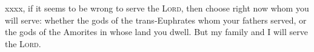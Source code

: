 
\begin{inparaenum}
     xxxx, if it seems to be wrong to serve the \textsc{Lord}, then choose right now whom you will serve: whether the gods of the trans-Euphrates whom your fathers served, or the gods of the Amorites in whose land you dwell. But my family and I will serve the \textsc{Lord}.%
\end{inparaenum}
